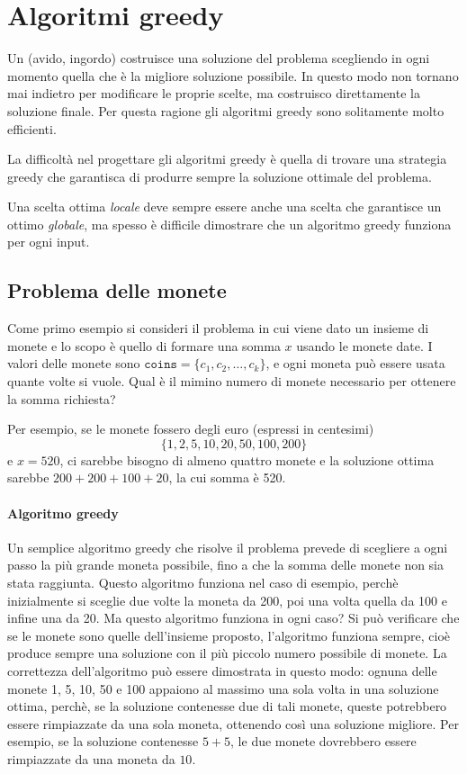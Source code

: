 \chapter{Algoritmi greedy}


Un  (avido, ingordo)
costruisce una soluzione del problema
scegliendo in ogni momento quella che è 
la migliore soluzione possibile.
In questo modo
non tornano mai indietro per modificare le proprie scelte,
ma costruisco direttamente la soluzione finale.
Per questa ragione gli algoritmi greedy sono solitamente
molto efficienti.

La difficoltà nel progettare gli algoritmi greedy
è quella di trovare una strategia greedy che garantisca 
di produrre sempre la soluzione ottimale del problema.

Una scelta ottima \textit{locale} deve sempre 
essere anche una scelta che garantisce un ottimo \textit{globale},
ma spesso è difficile dimostrare che un algoritmo greedy
funziona per ogni input.


\section{Problema delle monete}

Come primo esempio si consideri il problema 
in cui viene dato un insieme di monete e lo scopo
è quello di formare una somma $x$ usando le monete date.
I valori delle monete sono
$\texttt{coins}=\{c_1,c_2,\ldots,c_k\}$,
e ogni moneta può essere usata quante volte si vuole.
Qual è il mimino numero di monete necessario per ottenere la somma richiesta?

Per esempio, se le monete fossero degli euro (espressi in centesimi)
\[\{1,2,5,10,20,50,100,200\}\]
e $x=520$,
ci sarebbe bisogno di almeno quattro monete
e la soluzione ottima sarebbe
$200+200+100+20$, la cui somma è 520.

\subsubsection{Algoritmo greedy}

Un semplice algoritmo greedy che risolve il problema 
prevede di scegliere a ogni passo la più grande moneta possibile,
fino a che la somma delle monete non sia stata raggiunta.
Questo algoritmo funziona nel caso di esempio,
perchè inizialmente si sceglie due volte la moneta da 200,
poi una volta quella da 100 e infine una da 20.
Ma questo algoritmo funziona in ogni caso?
Si può verificare che se le monete sono quelle dell'insieme
proposto, l'algoritmo funziona sempre, cioè produce sempre 
una soluzione con il più piccolo numero possibile di monete.
La correttezza dell'algoritmo può essere dimostrata in questo modo:
ognuna delle monete 1, 5, 10, 50 e 100 appaiono al massimo 
una sola volta in una soluzione ottima,
perchè, se la soluzione contenesse due di tali monete,
queste potrebbero essere rimpiazzate da una sola moneta,
ottenendo così una soluzione migliore.
Per esempio, se la soluzione contenesse $5+5$,
le due monete dovrebbero essere rimpiazzate da una moneta da $10$.

